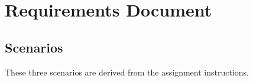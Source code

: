 %
%
%


\section{Requirements Document}
% 


\subsection{Scenarios}
These three scenarios are derived from the assignment instructions. \cite{2dv603:assignment1-instructions}

